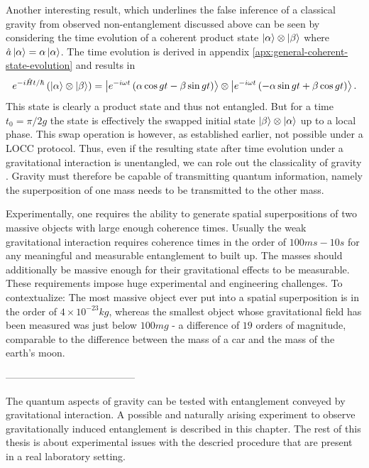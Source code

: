 Another interesting result, which underlines the false inference of a classical gravity from observed non-entanglement discussed above can be seen by considering the time evolution of a coherent product state $\ket{\alpha} \otimes \ket{\beta}$ where $\hat{a}\ket{\alpha} = \alpha\ket{\alpha}$. The time evolution is derived in appendix \ref{apx:general-coherent-state-evolution} and results in
\begin{equation}
  e^{-i\hat{H}t/\hbar} \left( \ket{\alpha} \otimes \ket{\beta} \right) = \ket{ e^{-i\omega t} \left( \alpha \cos gt - \beta \sin gt \right) }\otimes\ket{ e^{-i\omega t} \left( - \alpha \sin gt + \beta \cos gt \right) } .
\end{equation}
This state is clearly a product state and thus not entangled. But for a time $t_0 = \pi/2g$ the state is effectively the swapped initial state $\ket{\beta} \otimes \ket{\alpha}$ up to a local phase. This swap operation is however, as established earlier, not possible under a LOCC protocol. Thus, even if the resulting state after time evolution under a gravitational interaction is unentangled, we can role out the classicality of gravity \cite{Carney_2018,Lami_2024}. 
Gravity must therefore be capable of transmitting quantum information, namely the superposition of one mass needs to be transmitted to the other mass.

Experimentally, one requires the ability to generate spatial superpositions of two massive objects with large enough coherence times. Usually the weak gravitational interaction requires coherence times in the order of $100\si{ms} - 10\si{s}$ for any meaningful and measurable entanglement to built up. The masses should additionally be massive enough for their gravitational effects to be measurable.
These requirements impose huge experimental and engineering challenges. To contextualize: The most massive object ever put into a spatial superposition is in the order of $4 \times 10^{-23}\si{kg}$, whereas the smallest object whose gravitational field has been measured was just below $100 \si{mg}$ - a difference of $19$ orders of magnitude, comparable to the difference between the mass of a car and the mass of the earth's moon.




---------------------------------------




The quantum aspects of gravity can be tested with entanglement conveyed by gravitational interaction. A possible and naturally arising experiment to observe gravitationally induced entanglement is described in this chapter.
The rest of this thesis is about experimental issues with the descried procedure that are present in a real laboratory setting.

